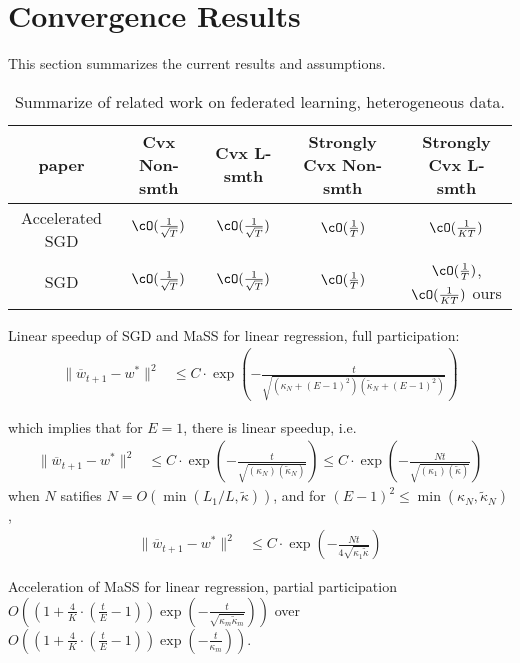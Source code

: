 


\section{Convergence Results}
This section summarizes the current results and assumptions.
\begin{table}[h!]
\centering
\small
	\begin{tabular}{|c|c|c|c|c|}\hline
		paper         &  Cvx Non-smth & Cvx L-smth & Strongly Cvx Non-smth& Strongly Cvx L-smth \\ \hline
	Accelerated	SGD   &   $\cO(\frac{1}{\sqrt{T}})$     & $\cO(\frac{1}{\sqrt{T}})$   &    $\cO(\frac{1}{T})$   &  $\cO(\frac{1}{KT})$    \\\hline
	SGD    &    $\cO(\frac{1}{\sqrt{T}})$  &   $\cO(\frac{1}{\sqrt{T}})$  &  $\cO(\frac{1}{T})$  & $\cO(\frac{1}{T})$\cite{li2019convergence,haddadpour2019convergence}, $\cO(\frac{1}{KT})$ ours    \\\hline
	\end{tabular}
	\caption{Summarize of related work on federated learning, heterogeneous data.}
\end{table}

Linear speedup of SGD and MaSS for linear regression, full participation: 
\begin{align*}
\|\overline{w}_{t+1}-w^{\ast}\|^{2} & \leq C\cdot\exp(-\frac{t}{\sqrt{(\kappa_{N}+(E-1)^{2})(\tilde{\kappa}_{N}+(E-1)^{2})}})
\end{align*}

 which implies that for $E=1$, there is linear speedup, i.e. 
\begin{align*}
\|\overline{w}_{t+1}-w^{\ast}\|^{2} & \leq C\cdot\exp(-\frac{t}{\sqrt{(\kappa_{N})(\tilde{\kappa}_{N})}})\leq C\cdot\exp(-\frac{Nt}{\sqrt{(\kappa_{1})(\tilde{\kappa})}})
\end{align*}
when $N$ satifies $N=O(\min(L_{1}/L,\tilde{\kappa}))$, and for $(E-1)^{2}\leq\min(\kappa_{N},\tilde{\kappa}_{N})$,
\begin{align*}
\|\overline{w}_{t+1}-w^{\ast}\|^{2} & \leq C\cdot\exp(-\frac{Nt}{4\sqrt{\kappa_{1}\tilde{\kappa}}})
\end{align*}

Acceleration of MaSS for linear regression, partial participation $O((1+\frac{4}{K}\cdot(\frac{t}{E}-1))\exp(-\frac{t}{\sqrt{\kappa_{m}\tilde{\kappa}_{m}}}))$
over $O((1+\frac{4}{K}\cdot(\frac{t}{E}-1))\exp(-\frac{t}{\kappa_{m}}))$. 

